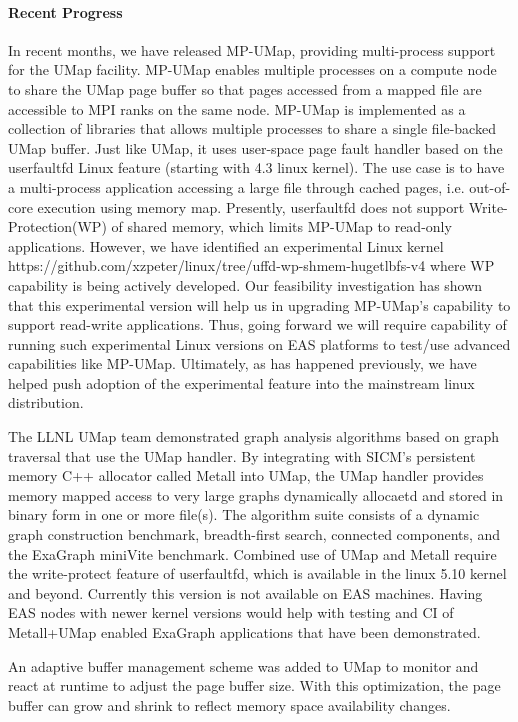 \paragraph{Recent Progress}

In recent months, we have released MP-UMap, providing multi-process
support for the UMap facility. MP-UMap enables multiple processes on a
compute node to share the UMap page buffer so that pages accessed from
a mapped file are accessible to MPI ranks on the same node. MP-UMap is
implemented as 
a collection of libraries that allows multiple processes to share a
single file-backed UMap buffer. Just like UMap, it uses user-space
page fault handler based on the userfaultfd Linux feature (starting
with 4.3 linux kernel). The use case is to have a multi-process
application accessing a large file through cached pages,
i.e. out-of-core execution using memory map. Presently, userfaultfd
does not support Write-Protection(WP) of shared memory, which limits
MP-UMap to read-only applications. However, we have identified an
experimental Linux kernel
https://github.com/xzpeter/linux/tree/uffd-wp-shmem-hugetlbfs-v4 where
WP capability is being actively developed. Our feasibility
investigation has shown that this experimental version will help us in
upgrading MP-UMap's capability to support read-write
applications. Thus, going forward we will require capability of
running such experimental Linux versions on EAS platforms to test/use
advanced capabilities like MP-UMap. Ultimately, as has happened
previously, we have helped push adoption of the experimental feature
into the mainstream linux distribution.

The LLNL UMap team demonstrated graph analysis algorithms based on
graph traversal that use the UMap handler.  By integrating with SICM’s
persistent memory C++ allocator called Metall into UMap, the UMap
handler provides memory mapped access to very large graphs dynamically
allocaetd and stored in binary form in one or more file(s). The
algorithm suite consists of a dynamic graph construction benchmark,
breadth-first search, connected components, and the ExaGraph miniVite
benchmark. Combined use of UMap and Metall require the write-protect
feature of userfaultfd, which is available in the linux 5.10 kernel
and beyond. Currently this version is not available on EAS
machines. Having EAS nodes with newer kernel versions would help with
testing and CI of Metall+UMap enabled ExaGraph applications that have
been demonstrated.

An adaptive buffer management scheme was added to UMap to monitor and
react at runtime to adjust the page buffer size. With this
optimization, the page buffer can grow and shrink to reflect memory
space availability changes.

